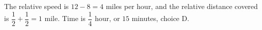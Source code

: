 The relative speed is $12-8=4$ miles per hour, and the relative distance covered is $\dfrac{1}{2}+\dfrac{1}{2}=1$ mile. Time is $\dfrac{1}{4}$ hour, or $\boxed{15}$ minutes, choice D.
